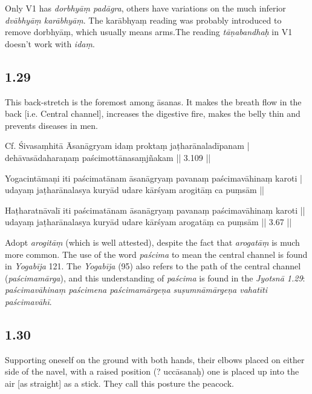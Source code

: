 \begin{ekdosis}
\begin{philcomm}[hp01_028]
Only V1 has \emph{dorbhyāṃ padāgra}, others have variations on the much inferior \emph{dvābhyāṃ karābhyāṃ}. The karābhyaṃ reading was probably introduced to remove dorbhyāṃ, which usually means arms.The reading \emph{tāṇabandhaḥ} in V1 doesn’t work with \emph{idaṃ}.
\end{philcomm}

\subsection*{1.29}
\begin{translation}[hp01_029]
This back-stretch is the foremost among āsanas. It makes the breath flow in the back [i.e. Central channel], increases the digestive fire, makes the belly thin and prevents diseases in men.
\end{translation}

\begin{sources}[hp01_029]
Cf. Śivasaṃhitā
\startverse
Āsanāgryam idaṃ proktaṃ jaṭharānaladīpanam |\\
dehāvasādaharaṇaṃ paścimottānasaṃjñakam || 3.109 ||
\endverse
\end{sources}

\begin{testimonia}[hp01_029]
Yogacintāmaṇi
\startverse
iti paścimatānam āsanāgryaṃ
pavanaṃ paścimavāhinaṃ karoti |\\
udayaṃ jaṭharānalasya kuryād
udare kārśyam arogitāṃ ca puṃsām ||
\endverse

Haṭharatnāvalī
\startverse
iti paścimatānam āsanāgryaṃ pavanaṃ paścimavāhinaṃ karoti ||\\
udayaṃ jaṭharānalasya kuryād udare kārśyam arogatāṃ ca puṃsām || 3.67 ||
\endverse
\end{testimonia}

\begin{philcomm}[hp01_029]
Adopt \emph{arogitāṃ} (which is well attested), despite the fact that \emph{arogatāṃ} is much more common. The use of the word \emph{paścima} to mean the central channel is found in \emph{Yogabīja} 121. The  \emph{Yogabīja} (95) also refers to the path of the central channel (\emph{paścimamārga}), and this understanding of \emph{paścima} is found in the \emph{Jyotsnā 1.29}: \emph{paścimavāhinaṃ paścimena paścimamārgeṇa suṣumnāmārgeṇa vahatīti paścimavāhī}.
\end{philcomm}

\subsection*{1.30}
\begin{translation}[hp01_030]
Supporting oneself on the ground with both hands, their elbows placed on either side of the navel, with a raised position (? uccāsanaḥ) one is placed up into the air [as straight] as a stick. They call this posture the peacock.
\end{translation}


\end{ekdosis}
